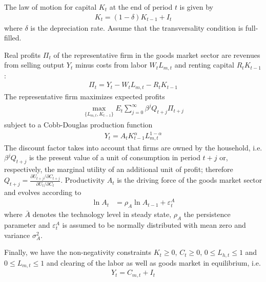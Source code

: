 \documentclass[a4paper]{scrartcl}
\begin{document}
The law of motion for capital $K_t$ at the end of period $t$ is given by
\begin{align*}
K_{t} = (1-\delta)K_{t-1} + I_t
\end{align*}
where $\delta$ is the depreciation rate. Assume that the transversality condition is full-filled.

Real profits $\Pi_t$ of the representative firm in the goods market sector are revenues from selling output $Y_t$ minus costs from labor $W_t L_{m,t}$ and renting capital $R_t K_{t-1}$:
\begin{align*}
\Pi_t = Y_{t} - W_{t} L_{m,t} - R_{t} K_{t-1}
\end{align*}	
The representative firm maximizes expected profits
\begin{align*}
\underset{\{L_{m,t},K_{t-1}\}}{\max} E_t \sum_{j=0}^{\infty} \beta^j Q_{t+j}\Pi_{t+j}
\end{align*}
subject to a Cobb-Douglas production function
\begin{align*}
Y_t = A_t K_{t-1}^\alpha L_{m,t}^{1-\alpha}
\end{align*}
The discount factor takes into account that firms are owned by the household, i.e. $\beta^j Q_{t+j}$ is the present value of a unit of consumption in period $t+j$ or, respectively, the marginal utility of an additional unit of profit; therefore $Q_{t+j}=\frac{\partial U_{t+j}/\partial C_{t+j}}{\partial U_{t}/\partial C_{t}}$. Productivity $A_t$ is the driving force of the goods market sector and evolves according to
\begin{align*}
\ln{A_{t}} &= \rho_A \ln{A_{t-1}}  + \varepsilon_t^A
\end{align*}
where $\bar{A}$ denotes the technology level in steady state, $\rho_A$ the persistence parameter and $\varepsilon_t^A$ is assumed to be normally distributed with mean zero and variance $\sigma_A^2$.

Finally, we have the non-negativity constraints	$K_t \geq0$, $C_t \geq 0$, $0\leq L_{h,t} \leq 1$ and $0\leq L_{m,t} \leq 1$ and clearing of the labor as well as goods market in equilibrium, i.e.
\begin{align*}
Y_t = C_{m,t} + I_t
\end{align*}
\end{document}
